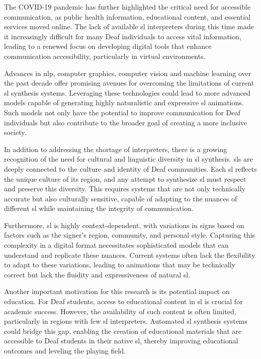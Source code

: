 \documentclass[../../main.tex]{subfiles}
\begin{document}
The COVID-19 pandemic has further highlighted the critical need for accessible communication, as public health information, educational content, and essential services moved online. The lack of available \gls{sl} interpreters during this time made it increasingly difficult for many Deaf individuals to access vital information, leading to a renewed focus on developing digital tools that enhance communication accessibility, particularly in virtual environments.

Advances in \gls{nlp}, computer graphics, computer vision and machine learning  over the past decade offer promising avenues for overcoming the limitations of current \gls{sl} synthesis systems. Leveraging these technologies could lead to more advanced models capable of generating highly naturalistic and expressive \gls{sl} animations. Such models not only have the potential to improve communication for Deaf individuals but also contribute to the broader goal of creating a more inclusive society.

In addition to addressing the shortage of interpreters, there is a growing recognition of the need for cultural and linguistic diversity in \gls{sl} synthesis. \gls{sl}s are deeply connected to the culture and identity of Deaf communities. Each \gls{sl} reflects the unique culture of its region, and any attempt to synthesize \gls{sl} must respect and preserve this diversity. This requires systems that are not only technically accurate but also culturally sensitive, capable of adapting to the nuances of different \gls{sl} while maintaining the integrity of communication.

Furthermore, \gls{sl} is highly context-dependent, with variations in signs based on factors such as the signer’s region, community, and personal style. Capturing this complexity in a digital format necessitates sophisticated models that can understand and replicate these nuances. Current systems often lack the flexibility to adapt to these variations, leading to animations that may be technically correct but lack the fluidity and expressiveness of natural \gls{sl}.

Another important motivation for this research is its potential impact on education. For Deaf students, access to educational content in \gls{sl} is crucial for academic success. However, the availability of such content is often limited, particularly in regions with few \gls{sl} interpreters. Automated \gls{sl} synthesis systems could bridge this gap, enabling the creation of educational materials that are accessible to Deaf students in their native \gls{sl}, thereby improving educational outcomes and leveling the playing field.
\end{document}
